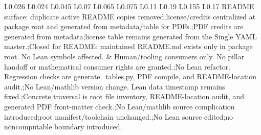 \begin{longtable}{L{0.026\linewidth} L{0.024\linewidth} L{0.045\linewidth} L{0.07\linewidth} L{0.065\linewidth} L{0.075\linewidth} L{0.11\linewidth} L{0.19\linewidth} L{0.155\linewidth} L{0.17\linewidth}}
README surface: duplicate active README copies removed;\newline license/\allowbreak{}credits centralized at package root and generated from metadata/\allowbreak{}table for PDFs.;\newline PDF credits are generated from metadata;\newline license table remains generated from the Single YAML master.;\newline Closed for README: maintained README.md exists only in package root. No Lean symbols affected. & Human/\allowbreak{}tooling consumers only. No pillar handoff or mathematical consumer rights are granted.;\newline No Lean refactor. Regression checks are generate\_tables.py, PDF compile, and README-location audit.;\newline No Lean/\allowbreak{}mathlib version change. Lean data timestamp remains fixed.;\newline Concrete traversal is root file inventory, README-location audit, and generated PDF front-matter check.;\newline No Lean/\allowbreak{}mathlib source complication introduced;\newline root manifest/\allowbreak{}toolchain unchanged.;\newline No Lean source edited;\newline no noncomputable boundary introduced.\\
\hline
\addlinespace[0.24em]

\end{longtable}
